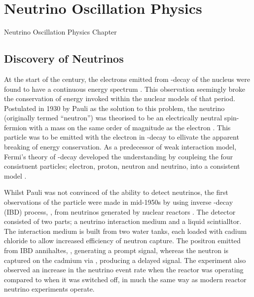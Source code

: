 \chapter{Neutrino Oscillation Physics}
\label{chap:NeutrinoOscillationPhysics}
Neutrino Oscillation Physics Chapter

\section{Discovery of Neutrinos}
\label{sec:NeutrinoOscillationPhysics_Discovery}

At the start of the  century, the electrons emitted from \quickmath{\beta}-decay of the nucleus were found to have a continuous energy spectrum \cite{Chadwick:262756, Ellis1927-qf}. This observation seemingly broke the conservation of energy invoked within the nuclear models of that period.  Postulated in 1930 by Pauli as the solution to this problem, the neutrino (originally termed ``neutron'') was theorised to be an electrically neutral spin- fermion with a mass on the same order of magnitude as the electron \cite{Pauli:1930pc}. This particle was to be emitted with the electron in \quickmath{\beta}-decay to ellivate the apparent breaking of energy conservation. As a predecessor of weak interaction model, Fermi's theory of \quickmath{\beta}-decay developed the understanding by coupleing the four consistuent particles; electron, proton, neutron and neutrino, into a consistent model \cite{Fermi:1934hr}.

Whilst Pauli was not convinced of the ability to detect neutrinos, the first observations of the particle were made in mid-1950s by using inverse \quickmath{\beta}-decay (IBD) process, , from neutrinos generated by nuclear reactors \cite{reines_cowan_1,reines_cowan_2}.
The detector consisted of two parts; a neutrino interaction medium and a liquid scintialltor. The interaction medium is built from two water tanks, each loaded with cadium chloride to allow increased efficiency of neutron capture. The positron emitted from IBD annihaltes, , generating a prompt signal, whereas the neutron is captured on the cadmium via , producing a delayed signal. The experiment also observed an increase in the neutrino event rate when the reactor was operating compared to when it was switched off, in much the same way as modern reactor neutrino experiments operate.

